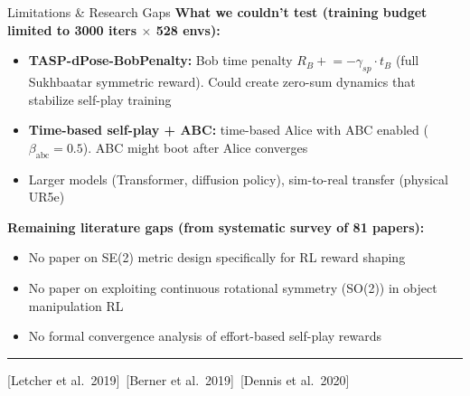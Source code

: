 \documentclass[aspectratio=169,xcolor=dvipsnames,t]{beamer}
\newcommand{\litfooter}[1]{%
  \vspace{2pt}%
  \hrule%
  \vspace{2pt}%
  {\tiny\color{LightDarkGrey} #1}%
}
\begin{document}
\begin{frame}[t]{Limitations \& Research Gaps}
  \textbf{What we couldn't test (training budget limited to 3000 iters $\times$ 528 envs):}
  \begin{itemize}
    \item \textbf{TASP-dPose-BobPenalty:} Bob time penalty $R_B \mathrel{+}= -\gamma_{sp}\!\cdot\!t_B$ (full Sukhbaatar symmetric reward). Could create zero-sum dynamics that stabilize self-play training
    \item \textbf{Time-based self-play + ABC:} time-based Alice with ABC enabled ($\beta_{\text{abc}}=0.5$). ABC might boot after Alice converges
    \item Larger models (Transformer, diffusion policy), sim-to-real transfer (physical UR5e)
  \end{itemize}

  \vspace{1pt}
  \textbf{Remaining literature gaps (from systematic survey of 81 papers):}
  \begin{itemize}
    \item No paper on SE(2) metric design specifically for RL reward shaping
    \item No paper on exploiting continuous rotational symmetry (SO(2)) in object manipulation RL
    \item No formal convergence analysis of effort-based self-play rewards
  \end{itemize}

  \vfill\litfooter{[Letcher et al.\ 2019]~[Berner et al.\ 2019]~[Dennis et al.\ 2020]}
\end{frame}
\end{document}
